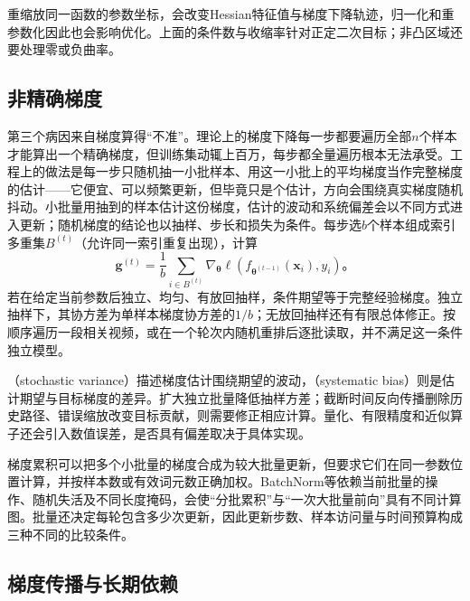 重缩放同一函数的参数坐标，会改变Hessian特征值与梯度下降轨迹，归一化和重参数化因此也会影响优化。上面的条件数与收缩率针对正定二次目标；非凸区域还要处理零或负曲率。

\subsection{非精确梯度}
\label{sec:training-inexact-gradients}

第三个病因来自梯度算得“不准”。理论上的梯度下降每一步都要遍历全部$n$个样本才能算出一个精确梯度，但训练集动辄上百万，每步都全量遍历根本无法承受。工程上的做法是每一步只随机抽一小批样本、用这一小批上的平均梯度当作完整梯度的估计——它便宜、可以频繁更新，但毕竟只是个估计，方向会围绕真实梯度随机抖动。小批量用抽到的样本估计这份梯度，估计的波动和系统偏差会以不同方式进入更新；随机梯度的结论也以抽样、步长和损失为条件。每步选$b$个样本组成索引多重集$B^{(t)}$（允许同一索引重复出现），计算
\begin{equation}
  \bm g^{(t)}=\frac1b\sum_{i\in B^{(t)}}
    \nabla_{\bm\theta}\ell(f_{\bm\theta^{(t-1)}}(\bm x_i),y_i)\text{。}
  \label{eq:training-minibatch-gradient}
\end{equation}
若在给定当前参数后独立、均匀、有放回抽样，条件期望等于完整经验梯度。独立抽样下，其协方差为单样本梯度协方差的$1/b$；无放回抽样还有有限总体修正。按顺序遍历一段相关视频，或在一个轮次内随机重排后逐批读取，并不满足这一条件独立模型。

（stochastic variance）描述梯度估计围绕期望的波动，（systematic bias）则是估计期望与目标梯度的差异。扩大独立批量降低抽样方差；截断时间反向传播删除历史路径、错误缩放改变目标贡献，则需要修正相应计算。量化、有限精度和近似算子还会引入数值误差，是否具有偏差取决于具体实现。

梯度累积可以把多个小批量的梯度合成为较大批量更新，但要求它们在同一参数位置计算，并按样本数或有效词元数正确加权。BatchNorm等依赖当前批量的操作、随机失活及不同长度掩码，会使“分批累积”与“一次大批量前向”具有不同计算图。批量还决定每轮包含多少次更新，因此更新步数、样本访问量与时间预算构成三种不同的比较条件。

\subsection{梯度传播与长期依赖}
\label{sec:training-gradient-propagation}

